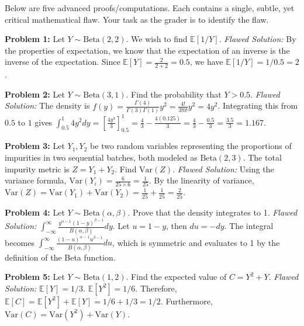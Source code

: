 \documentclass[11pt, a4paper]{article}
\theoremstyle{definition}
\theoremstyle{remark}
\newcommand{\E}{\mathbb{E}}
\begin{document}
Below are five advanced proofs/computations. Each contains a single, subtle, yet critical mathematical flaw. Your task as the grader is to identify the flaw.

\textbf{Problem 1:} Let $Y \sim \text{Beta}(2, 2)$. We wish to find $\E[1/Y]$.
\textit{Flawed Solution:} By the properties of expectation, we know that the expectation of an inverse is the inverse of the expectation. Since $\E[Y] = \frac{2}{2+2} = 0.5$, we have $\E[1/Y] = 1 / 0.5 = 2$.

\textbf{Problem 2:} Let $Y \sim \text{Beta}(3, 1)$. Find the probability that $Y > 0.5$.
\textit{Flawed Solution:} The density is $f(y) = \frac{\Gamma(4)}{\Gamma(3)\Gamma(1)} y^2 = \frac{4!}{3!0!} y^2 = 4y^2$. Integrating this from $0.5$ to $1$ gives $\int_{0.5}^1 4y^2 dy = \left[ \frac{4y^3}{3} \right]_{0.5}^1 = \frac{4}{3} - \frac{4(0.125)}{3} = \frac{4}{3} - \frac{0.5}{3} = \frac{3.5}{3} = 1.167$.

\textbf{Problem 3:} Let $Y_1, Y_2$ be two random variables representing the proportions of impurities in two sequential batches, both modeled as $\text{Beta}(2, 3)$. The total impurity metric is $Z = Y_1 + Y_2$. Find $\text{Var}(Z)$.
\textit{Flawed Solution:} Using the variance formula, $\text{Var}(Y_i) = \frac{6}{25 \times 6} = \frac{1}{25}$. By the linearity of variance, $\text{Var}(Z) = \text{Var}(Y_1) + \text{Var}(Y_2) = \frac{1}{25} + \frac{1}{25} = \frac{2}{25}$.

\textbf{Problem 4:} Let $Y \sim \text{Beta}(\alpha, \beta)$. Prove that the density integrates to 1.
\textit{Flawed Solution:} $\int_{-\infty}^{\infty} \frac{y^{\alpha-1}(1-y)^{\beta-1}}{B(\alpha, \beta)} dy$. Let $u = 1-y$, then $du = -dy$. The integral becomes $\int_{-\infty}^{\infty} \frac{(1-u)^{\alpha-1}u^{\beta-1}}{B(\alpha, \beta)} du$, which is symmetric and evaluates to 1 by the definition of the Beta function.

\textbf{Problem 5:} Let $Y \sim \text{Beta}(1, 2)$. Find the expected value of $C = Y^2 + Y$.
\textit{Flawed Solution:} $\E[Y] = 1/3$. $\E[Y^2] = 1/6$. Therefore, $\E[C] = \E[Y^2] + \E[Y] = 1/6 + 1/3 = 1/2$. Furthermore, $\text{Var}(C) = \text{Var}(Y^2) + \text{Var}(Y)$.
\end{document}
